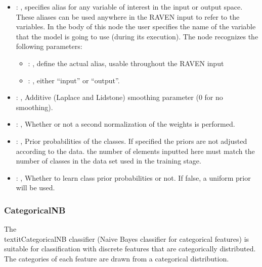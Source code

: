 \begin{itemize}
    \item {}: , 
      specifies alias for         any variable of interest in the input or output space. These
      aliases can be used anywhere in the RAVEN input to         refer to the variables. In the body
      of this node the user specifies the name of the variable that the model is going to use
      (during its execution).
      The  node recognizes the following parameters:
        \begin{itemize}
          \item {}: , 
            define the actual alias, usable throughout the RAVEN input
          \item {}: , 
            either ``input'' or ``output''.
      \end{itemize}

    \item {}: , 
      Additive (Laplace and Lidstone) smoothing parameter (0 for no smoothing).

    \item {}: , 
      Whether or not a second normalization of the weights is performed.

    \item {}: , 
      Prior probabilities of the classes. If specified the priors are
      not adjusted according to the data. \nb the number of elements inputted here must
      match the number of classes in the data set used in the training stage.

    \item {}: , 
      Whether to learn class prior probabilities or not. If false, a uniform
      prior will be used.
  \end{itemize}


\subsubsection{CategoricalNB}
  The \\textit{CategoricalNB} classifier (Naive Bayes classifier for categorical features)
  is suitable for classification with discrete features that are categorically distributed.
  The categories of each feature are drawn from a categorical distribution.

